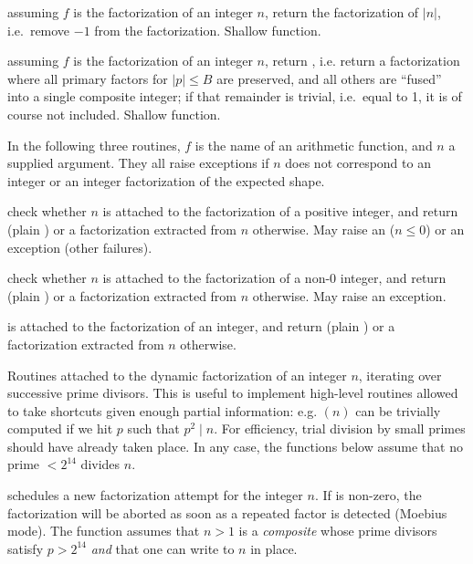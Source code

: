  assuming $f$ is the factorization of an
integer $n$, return the factorization of $|n|$, i.e.~remove $-1$ from the
factorization. Shallow function.

 assuming $f$ is the
factorization of an integer $n$, return , i.e.
return a factorization where all primary factors for $|p| \leq B$
are preserved, and all others are ``fused'' into a single composite
integer; if that remainder is trivial, i.e.~equal to 1, it is of course
not included. Shallow function.

In the following three routines, $f$ is the name of an arithmetic function,
and $n$ a supplied argument. They all raise exceptions if $n$ does not
correspond to an integer or an integer factorization of the expected shape.

 check whether $n$
is attached to the factorization of a positive integer, and return
 (plain ) or a factorization extracted from $n$ otherwise.
May raise an  ($n \leq 0$) or an  exception (other
failures).

 check whether $n$
is attached to the factorization of a non-$0$ integer, and return
 (plain ) or a factorization extracted from $n$ otherwise.
May raise an  exception.

is attached to the factorization of an integer, and return 
(plain ) or a factorization extracted from $n$ otherwise.


Routines attached to the dynamic factorization of an integer $n$, iterating
over successive prime divisors. This is useful to implement high-level
routines allowed to take shortcuts given enough partial information: e.g.
$(n)$ can be trivially computed if we hit $p$ such that $p^2
\mid n$. For efficiency, trial division by small primes should have already
taken place. In any case, the functions below assume that no prime $< 2^{14}$
divides $n$.

 schedules a new factorization
attempt for the integer $n$. If  is non-zero, the factorization
will be aborted as soon as a repeated factor is detected (Moebius mode).
The function assumes that $n > 1$ is a \emph{composite}  whose prime
divisors satisfy $p > 2^{14}$ \emph{and} that one can write to $n$ in place.

